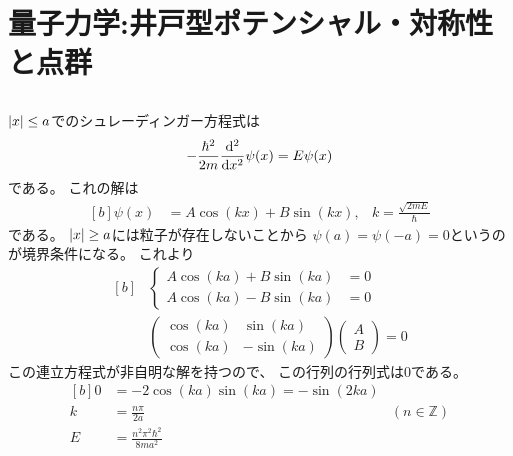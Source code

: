 \documentclass[../ap_2023.tex]{subfiles}
\begin{document}
\setcounter{chapter}{0}
\chapter{量子力学:井戸型ポテンシャル・対称性と点群}
\section{}
\subsection{}
\(\abs{x}\leq a\)でのシュレーディンガー方程式は
\begin{equation}\begin{aligned}[b]
    -\frac{\hbar^2}{2m}\dv[2]{x}\psi(x)=E\psi(x)
\end{aligned}\end{equation}
である。
これの解は
\begin{equation}\begin{aligned}[b]
    \psi(x) &= A\cos(kx)+B\sin(kx), &  k= \frac{\sqrt{2mE}}{\hbar}
\end{aligned}\end{equation}
である。
\(\abs{x}\geq a\)には粒子が存在しないことから
\(\psi(a)=\psi(-a)=0\)というのが境界条件になる。
これより
\begin{equation}\begin{aligned}[b]
    &\begin{cases}
        A\cos(ka)+B\sin(ka)&=0\\
        A\cos(ka)-B\sin(ka)&=0
    \end{cases}\\
    &\begin{pmatrix}
        \cos(ka) & \sin(ka)\\
        \cos(ka) & -\sin(ka)
    \end{pmatrix}\begin{pmatrix}
        A\\B
    \end{pmatrix}=0
\end{aligned}\end{equation}
この連立方程式が非自明な解を持つので、
この行列の行列式は\(0\)である。
\begin{equation}\begin{aligned}[b]
    0 &= -2\cos(ka)\sin(ka) = -\sin(2ka)\\
    k &= \frac{n\pi}{2a} & (n\in\mathbb{Z}) \\
    E &= \frac{n^2\pi^2\hbar^2}{8ma^2}
\end{aligned}\end{equation}
\end{document}
